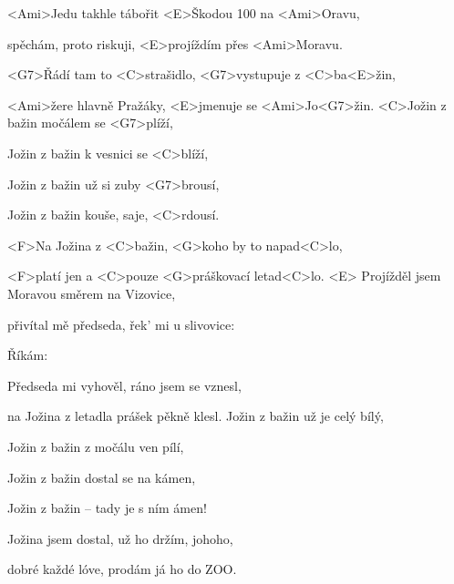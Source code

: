 
\zs
<Ami>Jedu takhle tábořit <E>Škodou 100 na <Ami>Oravu,

spěchám, proto riskuji, <E>projíždím přes <Ami>Moravu.

<G7>Řádí tam to <C>strašidlo, <G7>vystupuje z <C>ba<E>žin,

<Ami>žere hlavně Pražáky, <E>jmenuje se <Ami>Jo<G7>žin.
\ks
\zr
<C>Jožin z bažin močálem se <G7>plíží,

Jožin z bažin k vesnici se <C>blíží,

Jožin z bažin už si zuby <G7>brousí,

Jožin z bažin kouše, saje, <C>rdousí.

<F>Na Jožina z <C>bažin, <G>koho by to napad<C>lo,

<F>platí jen a <C>pouze <G>práškovací letad<C>lo. <E>
\kr
\zs
Projížděl jsem Moravou směrem na Vizovice,

přivítal mě předseda, řek' mi u slivovice:

\ks
\zr \kr
\zs
Říkám: 

Předseda mi vyhověl, ráno jsem se vznesl,

na Jožina z letadla prášek pěkně klesl.
\ks
\zr
Jožin z bažin už je celý bílý,

Jožin z bažin z močálu ven pílí,

Jožin z bažin dostal se na kámen,

Jožin z bažin -- tady je s ním ámen!

Jožina jsem dostal, už ho držím, johoho,

dobré každé lóve, prodám já ho do ZOO.
\kr
\kp






